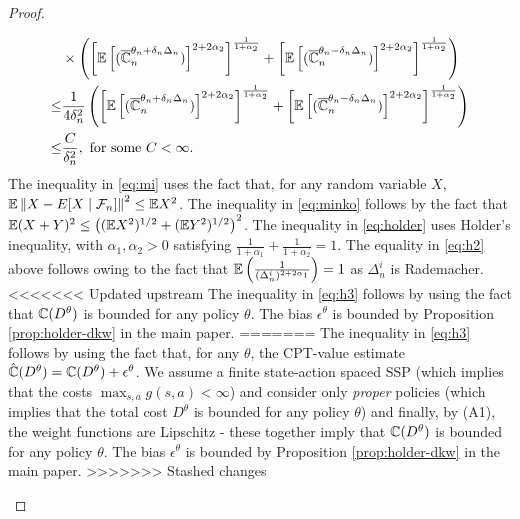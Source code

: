 \begin{proof}
\begin{itemize}
\begin{align}
& \times \left(\left[\mathbb{E}\left[ (\overline {\mathbb{C}}_n^{\theta_n + \delta_n \Delta_n})\right]^{2+2\alpha_2}\right]^{\frac{1}{1+\alpha_2}} +
\left[\mathbb{E}\left[ (\overline {\mathbb{C}}_n^{\theta_n - \delta_n \Delta_n})\right]^{2+2\alpha_2}\right]^{\frac{1}{1+\alpha_2}}\right)\label{eq:holder}\\
\le &\frac1{4\delta_n^2} \left(\left[\mathbb{E}\left[ (\overline {\mathbb{C}}_n^{\theta_n + \delta_n \Delta_n})\right]^{2+2\alpha_2}\right]^{\frac{1}{1+\alpha_2}} +
\left[\mathbb{E}\left[ (\overline {\mathbb{C}}_n^{\theta_n - \delta_n \Delta_n})\right]^{2+2\alpha_2}\right]^{\frac{1}{1+\alpha_2}}\right) \label{eq:h2}\\
\le & \frac{C}{\delta_n^2}, \text{ for some } C< \infty. \label{eq:h3}
\end{align}
The inequality in \eqref{eq:mi} uses the fact that, for any random variable $X$, $\mathbb{E}\left\|X -  E[X\mid\mathcal{F}_n]\right\|^2 \le \mathbb{E} X^2$. The inequality in \eqref{eq:minko} follows by the fact that $\mathbb{E} (X+Y)^2 \le \left( (\mathbb{E} X^2)^{1/2} + (\mathbb{E} Y^2)^{1/2}\right)^2$.
The inequality in \eqref{eq:holder} uses Holder's inequality, with $\alpha_1, \alpha_2>0$ satisfying $\frac{1}{1+\alpha_1} + \frac{1}{1+\alpha_2}=1$. 
The equality in \eqref{eq:h2} above follows owing to the fact that $\mathbb{E}\left(\frac1{(\Delta_n^i)^{2+2\alpha_1}}\right)  = 1$ as $\Delta_n^i$ is Rademacher. 
<<<<<<< Updated upstream
The inequality in \eqref{eq:h3} follows by using the fact that
$\mathbb{C}(D^\theta)$ is bounded for any policy $\theta$. The bias $\epsilon^\theta$ is bounded by Proposition \ref{prop:holder-dkw} in the main paper.
=======
The inequality in \eqref{eq:h3} follows by using the fact that, for any $\theta$, the CPT-value estimate $\hat {\mathbb{C}}(D^\theta) = \mathbb{C}(D^\theta) + \epsilon^\theta$. We assume a finite state-action spaced SSP (which implies that the costs $\max_{s,a} g(s,a) < \infty$) and consider only \textit{proper} policies (which implies that the total cost $D^\theta$ is bounded for any policy $\theta$) and finally, by (A1), the weight functions are Lipschitz - these together imply that $\mathbb{C}(D^\theta)$ is bounded for any policy $\theta$. The bias $\epsilon^\theta$ is bounded by Proposition \ref{prop:holder-dkw} in the main paper.
>>>>>>> Stashed changes


\end{itemize}
\end{proof}
